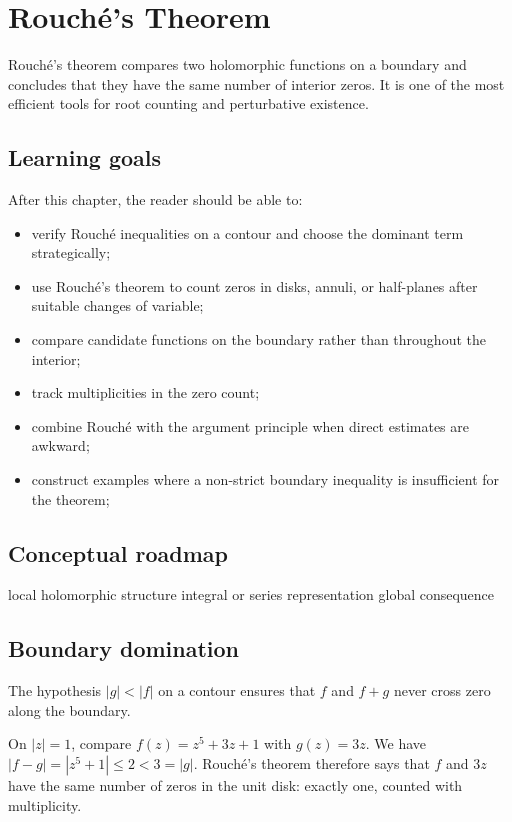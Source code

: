 \chapter{Rouché's Theorem}
\label{ch:iv13}

Rouché's theorem compares two holomorphic functions on a boundary and concludes that they have the same number of interior zeros. It is one of the most efficient tools for root counting and perturbative existence.

\section*{Learning goals}
After this chapter, the reader should be able to:
\begin{itemize}
\item verify Rouché inequalities on a contour and choose the dominant term strategically;
\item use Rouché's theorem to count zeros in disks, annuli, or half-planes after suitable changes of variable;
\item compare candidate functions on the boundary rather than throughout the interior;
\item track multiplicities in the zero count;
\item combine Rouché with the argument principle when direct estimates are awkward;
\item construct examples where a non-strict boundary inequality is insufficient for the theorem;
\end{itemize}
\section*{Conceptual roadmap}
\volroadmap
  {local holomorphic structure}
  {integral or series representation}
  {global consequence}

\section{Boundary domination}
The hypothesis $|g|<|f|$ on a contour ensures that $f$ and $f+g$ never cross zero along the boundary.

\begin{example}\label{ex:iv13-expand-01}
On \(|z|=1\), compare \(f(z)=z^5+3z+1\) with \(g(z)=3z\). We have \(|f-g|=|z^5+1|\le2<3=|g|\). Rouché's theorem therefore says that \(f\) and \(3z\) have the same number of zeros in the unit disk: exactly one, counted with multiplicity.
\end{example}
